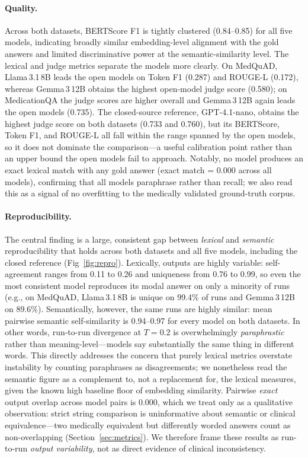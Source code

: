 \documentclass[11pt]{article}
\begin{document}
\paragraph{Quality.}
Across both datasets, BERTScore F1 is tightly clustered (0.84--0.85)
for all five models, indicating broadly similar embedding-level
alignment with the gold answers and limited discriminative power at the
semantic-similarity level. The lexical and judge metrics separate the
models more clearly. On MedQuAD, Llama\,3.1\,8B leads the open models on
Token F1 (0.287) and ROUGE-L (0.172), whereas Gemma\,3\,12B obtains the
highest open-model judge score (0.580); on MedicationQA the judge scores
are higher overall and Gemma\,3\,12B again leads the open models (0.735).
The closed-source reference, GPT-4.1-nano, obtains the highest judge
score on both datasets (0.733 and 0.760), but its BERTScore, Token F1,
and ROUGE-L all fall within the range spanned by the open models, so it
does not dominate the comparison---a useful calibration point rather
than an upper bound the open models fail to approach.
Notably, no model produces an exact lexical match with any gold
answer (exact match = 0.000 across all models), confirming that all
models paraphrase rather than recall; we also read this as a signal of
no overfitting to the medically validated ground-truth corpus.

\paragraph{Reproducibility.}
The central finding is a large, consistent gap between \emph{lexical}
and \emph{semantic} reproducibility that holds across both datasets and
all five models, including the closed reference (Fig~\ref{fig:repro}).
Lexically, outputs are highly variable: self-agreement ranges from 0.11
to 0.26 and uniqueness from 0.76 to 0.99, so even the most consistent
model reproduces its modal answer on only a minority of runs (e.g., on
MedQuAD, Llama\,3.1\,8B is unique on 99.4\% of runs and Gemma\,3\,12B on
89.6\%). Semantically, however, the same runs are highly similar: mean
pairwise semantic self-similarity is 0.94--0.97 for every model on both
datasets. In other words, run-to-run divergence at $T{=}0.2$ is
overwhelmingly \emph{paraphrastic} rather than meaning-level---models
say substantially the same thing in different words. This directly
addresses the concern that purely lexical metrics overstate instability
by counting paraphrases as disagreements; we nonetheless read the
semantic figure as a complement to, not a replacement for, the lexical
measures, given the known high baseline floor of embedding similarity.
Pairwise \emph{exact} output overlap across model pairs is 0.000, which
we treat only as a qualitative observation: strict string comparison is
uninformative about semantic or clinical equivalence---two medically
equivalent but differently worded answers count as non-overlapping
(Section~\ref{sec:metrics}). We therefore frame these results as
run-to-run \emph{output variability}, not as direct evidence of clinical
inconsistency.
\end{document}
